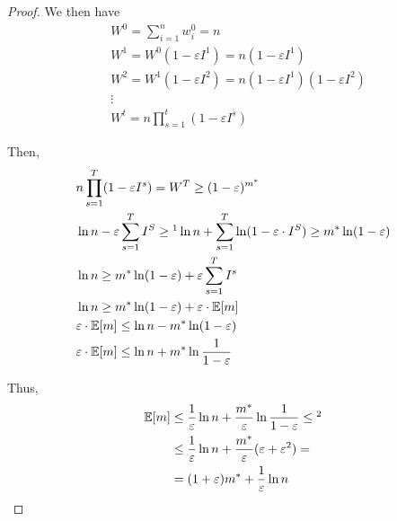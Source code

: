 \begin{proof}
        We then have
        \begin{equation*}
            \begin{split}
                &W^0 = \sum_{i=1}^{n} w_i^0 = n\\
                &W^1 = W^0 (1 - \varepsilon I^1) = n (1 - \varepsilon I^1)\\
                &W^2 = W^1 (1 - \varepsilon I^2) = n (1 - \varepsilon I^1)(1 - \varepsilon I^2)\\
                &\vdots\\
                &W^t = n \prod_{s=1}^t (1 - \varepsilon I^s)
            \end{split}
        \end{equation*}

        Then,
        \begin{equation*}
            \begin{split}
                &n \prod_{s=1}^{T} (1 - \varepsilon I^s) = W^T \geq (1 - \varepsilon)^{m^*}\\
                &\ln n - \varepsilon \sum_{s=1}^T I^S \geq\footnotemark \ln n + \sum_{s=1}^T \ln(1 - \varepsilon \cdot I^S) \geq m^* \ln (1 - \varepsilon)\\
                &\ln n \geq m^* \ln (1 - \varepsilon) + \varepsilon \sum_{s=1}^{T} I^s\\
                &\ln n \geq m^* \ln (1 - \varepsilon) + \varepsilon \cdot \expected[m]\\
                &\varepsilon \cdot \expected[m] \leq \ln n - m^* \ln (1 - \varepsilon)\\
                &\varepsilon \cdot \expected[m] \leq \ln n + m^* \ln \frac{1}{1 - \varepsilon}\\
            \end{split}
        \end{equation*}
        
        Thus,
        \begin{equation*}
            \begin{split}
                \expected[m] &\leq \frac{1}{\varepsilon} \ln n + \frac{m^*}{\varepsilon} \ln \frac{1}{1 - \varepsilon} \leq\footnotemark\\
                    &\leq \frac{1}{\varepsilon} \ln n + \frac{m^*}{\varepsilon} (\varepsilon + \varepsilon^2) =\\
                    &= (1 + \varepsilon) m^* + \frac{1}{\varepsilon} \ln n
            \end{split}
        \end{equation*}
    \end{proof}